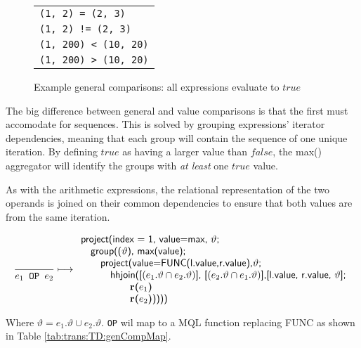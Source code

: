 \begin{figure}[h]
\centering
\begin{tabular}{l}
\texttt{(1, 2) = (2, 3)} \\
\texttt{(1, 2) != (2, 3)} \\
\texttt{(1, 200) < (10, 20)} \\
\texttt{(1, 200) > (10, 20)} \\
\end{tabular}
\caption[Example general comparisons]{\label{fig:trans:TD:genCompEx}Example
general comparisons: all expressions evaluate to $true$}
\end{figure}

The big difference between general and value comparisons is that the first must accomodate for sequences. This is
solved by grouping expressions' iterator dependencies, meaning that each group will contain the sequence of one
unique iteration. By defining $true$ as having a larger value than $false$, the \textsf{max()} aggregator will
identify the groups with \emph{at least} one $true$ value.

As with the arithmetic expressions, the relational representation of the two operands is joined on their common
dependencies to ensure that both values are from the same iteration.

\begin{equation}
\frac{}{e_1\mbox{\texttt{ OP }}e_2}\longmapsto
\begin{array}{l}
\mbox{\textsf{project(index = 1, value=max, }}\vartheta \textsf{;} \\ \quad
\mbox{\textsf{group((}}\vartheta\mbox{\textsf{), max(value);}} \\ \quad \quad
\mbox{\textsf{project(value=FUNC(l.value,r.value),}}\vartheta\mbox{\textsf{;}} \\ \quad \quad \quad
\mbox{\textsf{hhjoin([}}(e_1.\vartheta\cap e_2.\vartheta)\mbox{\textsf{], [}}(e_2.\vartheta\cap e_1.\vartheta)
\mbox{\textsf{],}} 
\mbox{\textsf{[l.value, r.value, }}\vartheta\mbox{\textsf{];}} \\ \quad \quad
\quad \quad \quad \mbox{\textbf{r(}}e_1\mbox{\textbf{)}} \\ \quad \quad \quad \quad \quad
\mbox{\textbf{r(}}e_2\mbox{\textbf{)}\textsf{))))}}
\end{array}
\label{rule:trans:TD:comparative}
\end{equation}

Where $\vartheta = e_1.\vartheta \cup e_2.\vartheta$. \texttt{OP} wil map to a MQL function replacing
\textsf{FUNC} as shown in Table \ref{tab:trans:TD:genCompMap}. 

